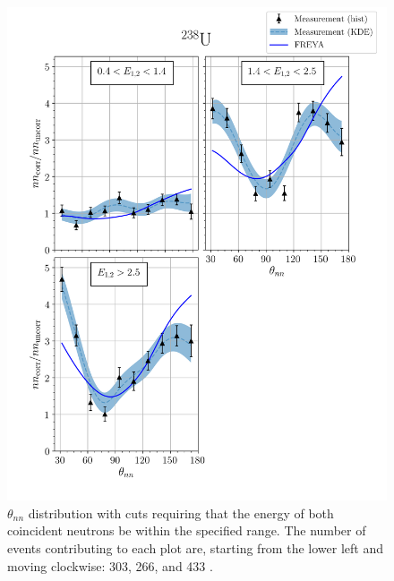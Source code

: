 \begin{figure}
\centering
    \includegraphics[width = 1.1\textwidth]{Content/Results/FinalDUResultw_freya2KDE.png}
    \caption{ $\theta_{nn}$ distribution with cuts requiring that the energy of both coincident neutrons be within the specified range.
    The number of events contributing to each plot are, starting from the lower left and moving clockwise: 303, 266, and 433 .}
    \label{fig:DU(2)}
\end{figure}
